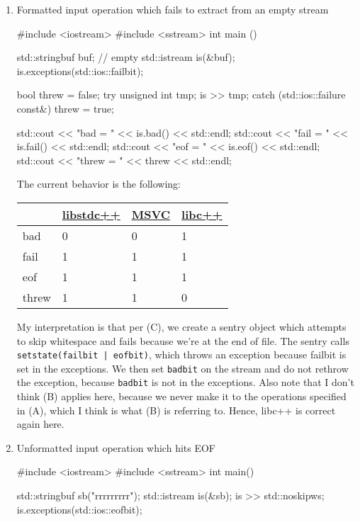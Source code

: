 \documentclass{wg21}
\newcommand{\cc}[1]{\texttt{#1}}
\begin{document}
\begin{enumerate}
  \item Formatted input operation which fails to extract from an empty stream
  \begin{cpp}
  #include <iostream>
  #include <sstream>
  int main () {
      std::stringbuf buf; // empty
      std::istream is(&buf);
      is.exceptions(std::ios::failbit);

      bool threw = false;
      try {
          unsigned int tmp{};
          is >> tmp;
      } catch (std::ios::failure const&) {
          threw = true;
      }

      std::cout << "bad = " << is.bad() << std::endl;
      std::cout << "fail = " << is.fail() << std::endl;
      std::cout << "eof = " << is.eof() << std::endl;
      std::cout << "threw = " << threw << std::endl;
  }
  \end{cpp}

  The current behavior is the following:
  \begin{center}
  \begin{tabular}{| l | l | l | l |}
  \hline
         & \href{https://wandbox.org/permlink/UpOSzH76Ovm4RzTz}{libstdc++}
         & \href{http://rextester.com/WBRK78783}{MSVC}
         & \href{https://wandbox.org/permlink/aL4Xl2d8VKVK2EY2}{libc++} \\ \hline
  bad    & 0         & 0    & 1      \\ \hline
  fail   & 1         & 1    & 1      \\ \hline
  eof    & 1         & 1    & 1      \\ \hline
  threw  & 1         & 1    & 0      \\ \hline
  \end{tabular}
  \end{center}

  My interpretation is that per (C), we create a sentry object which attempts
  to skip whitespace and fails because we're at the end of file. The sentry
  calls \cc{setstate(failbit | eofbit)}, which throws an exception because
  failbit is set in the exceptions. We then set \cc{badbit} on the stream and
  do not rethrow the exception, because \cc{badbit} is not in the exceptions.
  Also note that I don't think (B) applies here, because we never make it to
  the operations specified in (A), which I think is what (B) is referring to.
  Hence, libc++ is correct again here.

  \item Unformatted input operation which hits EOF
  \begin{cpp}
  #include <iostream>
  #include <sstream>
  int main() {
      std::stringbuf sb("rrrrrrrrr");
      std::istream is(&sb);
      is >> std::noskipws;
      is.exceptions(std::ios::eofbit);

}
\end{cpp}
\end{enumerate}
\end{document}
